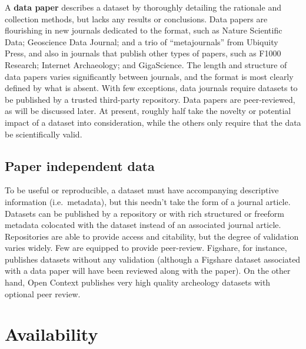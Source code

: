 \documentclass[10pt,a4paper,twocolumn]{article}
\begin{document}
A \textbf{data paper} describes a dataset by thoroughly detailing the rationale and collection methods, but lacks any results or conclusions. 
Data papers are flourishing in new journals dedicated to the format, such as Nature Scientific Data\cite{nature_scientific_data}; Geoscience Data Journal\cite{geoscience_data_journal}; and a trio of ``metajournals'' from Ubiquity Press\cite{ubiquity_press_metajournals}, and also in journals that publish other types of papers, such as F1000 Research\cite{f1000_research}; Internet Archaeology\cite{internet_archaeology}; and GigaScience\cite{gigascience}. 
The length and structure of data papers varies significantly between journals, and the format is most clearly defined by what is absent.
With few exceptions, data journals require datasets to be published by a trusted third-party repository. 
Data papers are peer-reviewed, as will be discussed later.  At present, roughly half take the novelty or potential impact of a dataset into consideration, while the others only require that the data be scientifically valid.

\subsection*{Paper independent data}\label{paper-independent-data}

To be useful or reproducible, a dataset must have accompanying descriptive information (i.e.~metadata), but this needn't take the form of a journal article. 
Datasets can be published by a repository or with rich structured or freeform metadata colocated with the dataset instead of an associated journal article. Repositories are able to provide access and citability, but the degree of validation varies widely. 
Few are equipped to provide peer-review. Figshare\cite{figshare}, for instance, publishes datasets without any validation (although a Figshare dataset associated with a data paper will have been reviewed along with the paper). 
On the other hand, Open Context\cite{open_context} publishes very high quality archeology datasets with optional peer review.


\section*{Availability}\label{availability}
\end{document}
